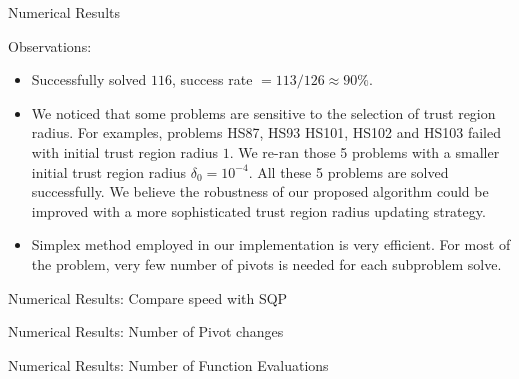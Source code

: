 \documentclass[8pt]{beamer}
\begin{document}
\begin{frame}{Numerical Results}


Observations: 
\vfill
\begin{itemize}
\item  
Successfully solved $116$, success rate   $  = 113/126 \approx 90 \%$. 
\vfill
\item   
We noticed that some problems
 are sensitive to the selection of trust region radius. For examples, problems HS87, HS93 HS101, HS102 and HS103 failed with initial trust region radius $1$. We re-ran those 5 problems with a smaller initial trust region radius $\delta_{0} = 10^{-4}$. All these 5 problems are solved successfully. We believe the robustness of our proposed algorithm could be improved with a more sophisticated trust region radius updating strategy. 
 \item Simplex method employed in our implementation is very efficient. For most of the problem, very few number of pivots is needed for each subproblem solve. 
\end{itemize}



\end{frame}

 

\begin{frame}[c]{Numerical Results: Compare speed with SQP  }



\end{frame}

 


\begin{frame}[c]{Numerical Results:  Number of Pivot changes }
\begin{center}
 
\end{center}
\end{frame}


\begin{frame}[c]{Numerical Results:  Number of Function Evaluations}
\begin{center}
 
\end{center}
\end{frame}
 
\end{document}
